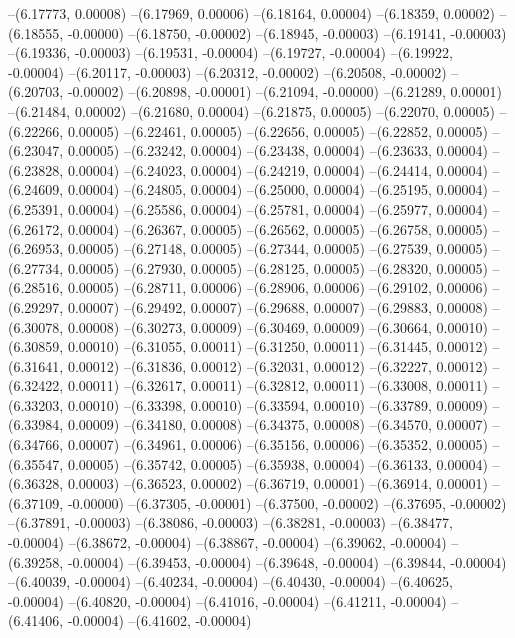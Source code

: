 --(6.17773, 0.00008)
--(6.17969, 0.00006)
--(6.18164, 0.00004)
--(6.18359, 0.00002)
--(6.18555, -0.00000)
--(6.18750, -0.00002)
--(6.18945, -0.00003)
--(6.19141, -0.00003)
--(6.19336, -0.00003)
--(6.19531, -0.00004)
--(6.19727, -0.00004)
--(6.19922, -0.00004)
--(6.20117, -0.00003)
--(6.20312, -0.00002)
--(6.20508, -0.00002)
--(6.20703, -0.00002)
--(6.20898, -0.00001)
--(6.21094, -0.00000)
--(6.21289, 0.00001)
--(6.21484, 0.00002)
--(6.21680, 0.00004)
--(6.21875, 0.00005)
--(6.22070, 0.00005)
--(6.22266, 0.00005)
--(6.22461, 0.00005)
--(6.22656, 0.00005)
--(6.22852, 0.00005)
--(6.23047, 0.00005)
--(6.23242, 0.00004)
--(6.23438, 0.00004)
--(6.23633, 0.00004)
--(6.23828, 0.00004)
--(6.24023, 0.00004)
--(6.24219, 0.00004)
--(6.24414, 0.00004)
--(6.24609, 0.00004)
--(6.24805, 0.00004)
--(6.25000, 0.00004)
--(6.25195, 0.00004)
--(6.25391, 0.00004)
--(6.25586, 0.00004)
--(6.25781, 0.00004)
--(6.25977, 0.00004)
--(6.26172, 0.00004)
--(6.26367, 0.00005)
--(6.26562, 0.00005)
--(6.26758, 0.00005)
--(6.26953, 0.00005)
--(6.27148, 0.00005)
--(6.27344, 0.00005)
--(6.27539, 0.00005)
--(6.27734, 0.00005)
--(6.27930, 0.00005)
--(6.28125, 0.00005)
--(6.28320, 0.00005)
--(6.28516, 0.00005)
--(6.28711, 0.00006)
--(6.28906, 0.00006)
--(6.29102, 0.00006)
--(6.29297, 0.00007)
--(6.29492, 0.00007)
--(6.29688, 0.00007)
--(6.29883, 0.00008)
--(6.30078, 0.00008)
--(6.30273, 0.00009)
--(6.30469, 0.00009)
--(6.30664, 0.00010)
--(6.30859, 0.00010)
--(6.31055, 0.00011)
--(6.31250, 0.00011)
--(6.31445, 0.00012)
--(6.31641, 0.00012)
--(6.31836, 0.00012)
--(6.32031, 0.00012)
--(6.32227, 0.00012)
--(6.32422, 0.00011)
--(6.32617, 0.00011)
--(6.32812, 0.00011)
--(6.33008, 0.00011)
--(6.33203, 0.00010)
--(6.33398, 0.00010)
--(6.33594, 0.00010)
--(6.33789, 0.00009)
--(6.33984, 0.00009)
--(6.34180, 0.00008)
--(6.34375, 0.00008)
--(6.34570, 0.00007)
--(6.34766, 0.00007)
--(6.34961, 0.00006)
--(6.35156, 0.00006)
--(6.35352, 0.00005)
--(6.35547, 0.00005)
--(6.35742, 0.00005)
--(6.35938, 0.00004)
--(6.36133, 0.00004)
--(6.36328, 0.00003)
--(6.36523, 0.00002)
--(6.36719, 0.00001)
--(6.36914, 0.00001)
--(6.37109, -0.00000)
--(6.37305, -0.00001)
--(6.37500, -0.00002)
--(6.37695, -0.00002)
--(6.37891, -0.00003)
--(6.38086, -0.00003)
--(6.38281, -0.00003)
--(6.38477, -0.00004)
--(6.38672, -0.00004)
--(6.38867, -0.00004)
--(6.39062, -0.00004)
--(6.39258, -0.00004)
--(6.39453, -0.00004)
--(6.39648, -0.00004)
--(6.39844, -0.00004)
--(6.40039, -0.00004)
--(6.40234, -0.00004)
--(6.40430, -0.00004)
--(6.40625, -0.00004)
--(6.40820, -0.00004)
--(6.41016, -0.00004)
--(6.41211, -0.00004)
--(6.41406, -0.00004)
--(6.41602, -0.00004)
